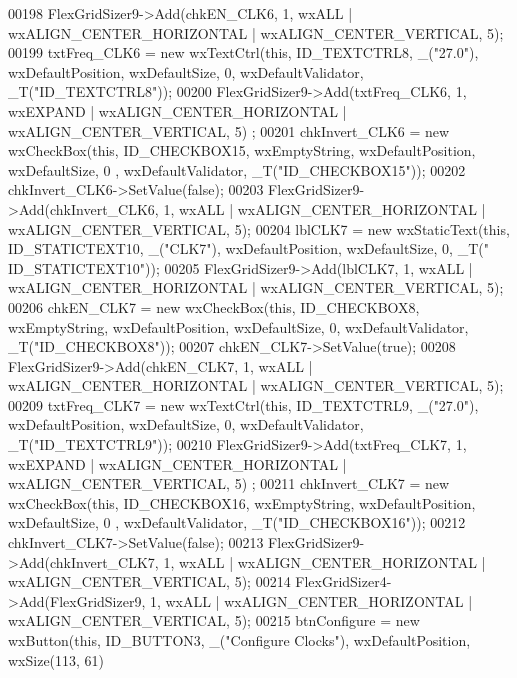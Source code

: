 \begin{DoxyCode}
00198     FlexGridSizer9->Add(chkEN\_CLK6, 1, wxALL | wxALIGN\_CENTER\_HORIZONTAL | wxALIGN\_CENTER\_VERTICAL, 5);
00199     txtFreq\_CLK6 = \textcolor{keyword}{new} wxTextCtrl(\textcolor{keyword}{this}, ID\_TEXTCTRL8, \_(\textcolor{stringliteral}{"27.0"}), wxDefaultPosition, wxDefaultSize, 0, 
      wxDefaultValidator, \_T(\textcolor{stringliteral}{"ID\_TEXTCTRL8"}));
00200     FlexGridSizer9->Add(txtFreq\_CLK6, 1, wxEXPAND | wxALIGN\_CENTER\_HORIZONTAL | wxALIGN\_CENTER\_VERTICAL, 5)
      ;
00201     chkInvert\_CLK6 = \textcolor{keyword}{new} wxCheckBox(\textcolor{keyword}{this}, ID\_CHECKBOX15, wxEmptyString, wxDefaultPosition, wxDefaultSize, 0
      , wxDefaultValidator, \_T(\textcolor{stringliteral}{"ID\_CHECKBOX15"}));
00202     chkInvert\_CLK6->SetValue(\textcolor{keyword}{false});
00203     FlexGridSizer9->Add(chkInvert\_CLK6, 1, wxALL | wxALIGN\_CENTER\_HORIZONTAL | wxALIGN\_CENTER\_VERTICAL, 5);
00204     lblCLK7 = \textcolor{keyword}{new} wxStaticText(\textcolor{keyword}{this}, ID\_STATICTEXT10, \_(\textcolor{stringliteral}{"CLK7"}), wxDefaultPosition, wxDefaultSize, 0, \_T(\textcolor{stringliteral}{"
      ID\_STATICTEXT10"}));
00205     FlexGridSizer9->Add(lblCLK7, 1, wxALL | wxALIGN\_CENTER\_HORIZONTAL | wxALIGN\_CENTER\_VERTICAL, 5);
00206     chkEN\_CLK7 = \textcolor{keyword}{new} wxCheckBox(\textcolor{keyword}{this}, ID\_CHECKBOX8, wxEmptyString, wxDefaultPosition, wxDefaultSize, 0, 
      wxDefaultValidator, \_T(\textcolor{stringliteral}{"ID\_CHECKBOX8"}));
00207     chkEN\_CLK7->SetValue(\textcolor{keyword}{true});
00208     FlexGridSizer9->Add(chkEN\_CLK7, 1, wxALL | wxALIGN\_CENTER\_HORIZONTAL | wxALIGN\_CENTER\_VERTICAL, 5);
00209     txtFreq\_CLK7 = \textcolor{keyword}{new} wxTextCtrl(\textcolor{keyword}{this}, ID\_TEXTCTRL9, \_(\textcolor{stringliteral}{"27.0"}), wxDefaultPosition, wxDefaultSize, 0, 
      wxDefaultValidator, \_T(\textcolor{stringliteral}{"ID\_TEXTCTRL9"}));
00210     FlexGridSizer9->Add(txtFreq\_CLK7, 1, wxEXPAND | wxALIGN\_CENTER\_HORIZONTAL | wxALIGN\_CENTER\_VERTICAL, 5)
      ;
00211     chkInvert\_CLK7 = \textcolor{keyword}{new} wxCheckBox(\textcolor{keyword}{this}, ID\_CHECKBOX16, wxEmptyString, wxDefaultPosition, wxDefaultSize, 0
      , wxDefaultValidator, \_T(\textcolor{stringliteral}{"ID\_CHECKBOX16"}));
00212     chkInvert\_CLK7->SetValue(\textcolor{keyword}{false});
00213     FlexGridSizer9->Add(chkInvert\_CLK7, 1, wxALL | wxALIGN\_CENTER\_HORIZONTAL | wxALIGN\_CENTER\_VERTICAL, 5);
00214     FlexGridSizer4->Add(FlexGridSizer9, 1, wxALL | wxALIGN\_CENTER\_HORIZONTAL | wxALIGN\_CENTER\_VERTICAL, 5);
00215     btnConfigure = \textcolor{keyword}{new} wxButton(\textcolor{keyword}{this}, ID\_BUTTON3, \_(\textcolor{stringliteral}{"Configure Clocks"}), wxDefaultPosition, wxSize(113, 61)

\end{DoxyCode}
